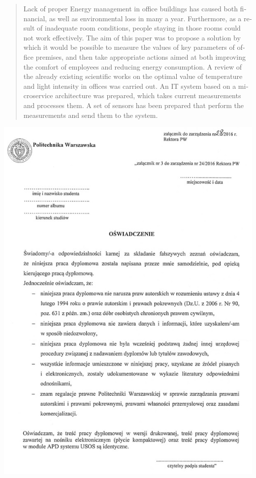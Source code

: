 \documentclass[11pt, a4]{article} %
\begin{document}
\begin{otherlanguage}{english}
\begin{abstract}
    Lack of proper Energy management in office buildings has caused both 
    financial, as well as environmental loss in many a year. Furthermore, as 
    a result of inadequate room conditions, people staying in those rooms could 
    not work effectively. The aim of this paper was to propose a solution by which 
    it would be possible to measure the values of key parameters of office 
    premises, and then take appropriate actions aimed at both improving the comfort 
    of employees and reducing energy consumption. A review of the already existing 
    scientific works on the optimal value of temperature and light intensity in 
    offices was carried out. An IT system based on a microservice architecture was 
    prepared, which takes current measurements and processes them. A set of sensors 
    has been prepared that perform the measurements and send them to the system.
\end{abstract}
\end{otherlanguage}

\includegraphics[width=1\textwidth]{oswiadczenie_o_samedzielnosci.jpg}
\end{document}
